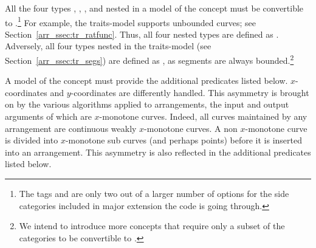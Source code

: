 All the four types ,
, , and
 nested in a model of the concept
 must be convertible to
.\footnote{The tags
   and  are only
  two out of a larger number of options for the side categories
  included in major extension the code is going through.}
For example, the  traits-model supports
unbounded curves; see Section~\ref{arr_ssec:tr_ratfunc}. Thus, all
four nested types are defined as .
Adversely, all four types nested in the 
traits-model (see Section~\ref{arr_ssec:tr_segs}) are defined as
, as segments are always
bounded.\footnote{We intend to introduce more concepts that require
  only a subset of the categories to be convertible to
  .}

A model of the concept  must provide
the additional predicates listed below. 
$x$-coordinates and $y$-coordinates are differently handled. This
asymmetry is brought on by the various algorithms applied to
arrangements, the input and output arguments of which are $x$-monotone
curves. Indeed, all curves maintained by any arrangement are
continuous weakly $x$-monotone curves. A non $x$-monotone curve is
divided into $x$-monotone sub curves (and perhaps points) before it
is inserted into an arrangement. This asymmetry is also reflected in
the additional predicates listed below.

